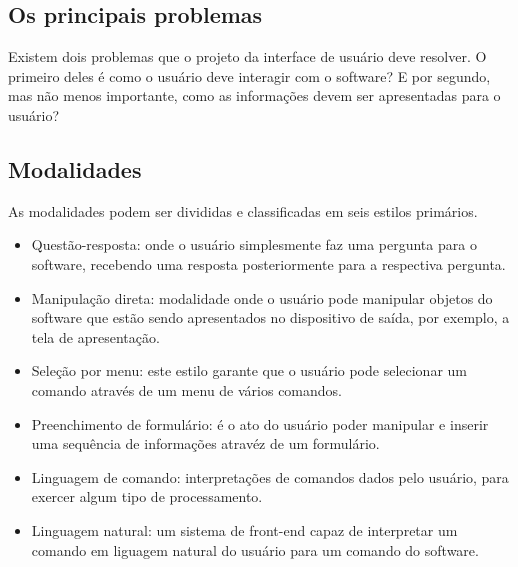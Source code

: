 \subsection[Os principais problemas]{Os principais problemas}
Existem dois problemas que o projeto da interface de usuário deve resolver. O
primeiro deles é como o usuário deve interagir com o software? E por segundo, mas
não menos importante, como as informações devem ser apresentadas para o usuário?

\subsection[Modalidade]{Modalidades}
As modalidades podem ser divididas e classificadas em seis estilos primários.

\begin{itemize}
    \item Questão-resposta: onde o usuário simplesmente faz uma pergunta para o
        software, recebendo uma resposta posteriormente para a respectiva pergunta.

    \item Manipulação direta: modalidade onde o usuário pode manipular objetos
        do software que estão sendo apresentados no dispositivo de saída, por
        exemplo, a tela de apresentação.

    \item Seleção por menu: este estilo garante que o usuário pode selecionar um
        comando através de um menu de vários comandos.

    \item Preenchimento de formulário: é o ato do usuário poder manipular e inserir
        uma sequência de informações atravéz de um formulário.

    \item Linguagem de comando: interpretações de comandos dados pelo usuário,
        para exercer algum tipo de processamento.

    \item Linguagem natural: um sistema de front-end capaz de interpretar um
        comando em liguagem natural do usuário para um comando do software.
\end{itemize}
